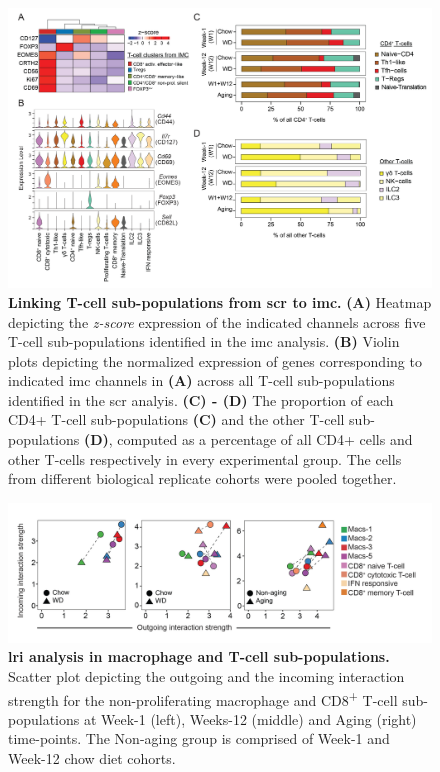 \begin{figure}[H]
    \centering
    \includegraphics[width=\linewidth]{Appendix2/Fig/F2-A8-01.png}
    \caption[Linking T-cell sub-populations from  to ]{\textbf{Linking T-cell sub-populations from \gls{scr} to \gls{imc}.} \textbf{(A)} Heatmap depicting the \textit{z-score} expression of the indicated channels across five T-cell sub-populations identified in the \gls{imc} analysis. \textbf{(B)} Violin plots depicting the normalized expression of genes corresponding to indicated \gls{imc} channels in \textbf{(A)} across all T-cell sub-populations identified in the \gls{scr} analyis. \textbf{(C) - (D)} The proportion of each CD4+ T-cell sub-populations \textbf{(C)} and the other T-cell sub-populations \textbf{(D)}, computed as a percentage of all CD4+ cells and other T-cells respectively in every experimental group. The cells from different biological replicate cohorts were pooled together.}
    \label{fig:app_scrna_tcells1}
\end{figure}


\begin{figure}[H]
    \centering
    \includegraphics[width=\linewidth]{Appendix2/Fig/F2-A1-v3-01.png}
    \caption[ analysis in macrophage and T-cell sub-populations]{\textbf{\gls{lri} analysis in macrophage and T-cell sub-populations.} Scatter plot depicting the outgoing and the incoming interaction strength for the non-proliferating macrophage and CD8\textsuperscript{+} T-cell sub-populations at Week-1 (left), Weeks-12 (middle) and Aging (right) time-points. The Non-aging group is comprised of Week-1 and Week-12 chow diet cohorts.}
    \label{fig:app_scrna_cellchat1}
\end{figure}

